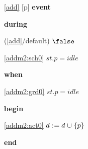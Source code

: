 \noindent \ref{add} [p] \textbf{event}
\begin{block}
  \item   \textbf{during}
  \begin{block}
  \item[ (\ref{add}/default) ]\sout{$\false$} %
  \end{block}
  \begin{block}
  \item[ \eqref{addm2:sch0} ]{$st.p = idle $} %
  \end{block}
  \item   \textbf{when}
  \begin{block}
  \item[ \eqref{addm2:grd0} ]{$st.p = idle $} %
  \end{block}
  \item   \textbf{begin}
  \begin{block}
  \item[ \eqref{addm2:act0} ]{$d \mathrel{:\mkern1mu=} d \mathbin{\mkern1mu\cup\mkern1mu} \{p\}$} %
  \end{block}
  \item   \textbf{end} \\
\end{block}
